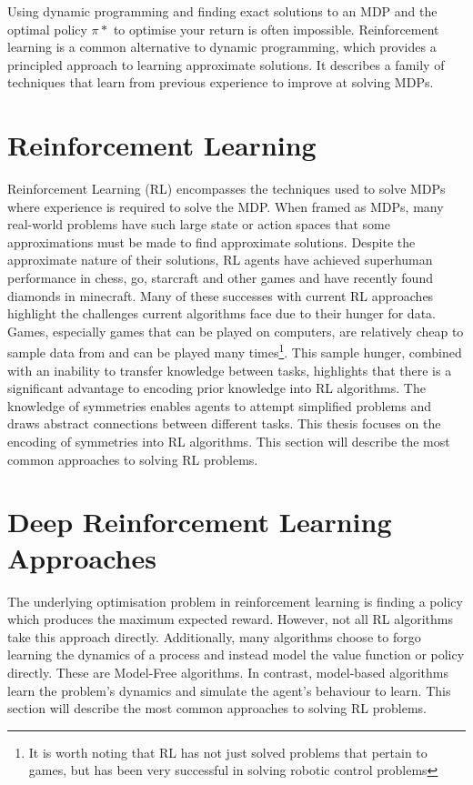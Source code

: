 Using dynamic programming and finding exact solutions to an MDP and the optimal policy $\pi*$ to optimise your return is often impossible. Reinforcement learning is a common alternative to dynamic programming, which provides a principled approach to learning approximate solutions. It describes a family of techniques that learn from previous experience to improve at solving MDPs.

\section{Reinforcement Learning}
Reinforcement Learning (RL) encompasses the techniques used to solve MDPs where experience is required to solve the MDP. When framed as MDPs, many real-world problems have such large state or action spaces that some approximations must be made to find approximate solutions. Despite the approximate nature of their solutions, RL agents have achieved superhuman performance in chess, go, starcraft and other games and have recently found diamonds in minecraft\cite{silver2016mastering,silver2017mastering,hafner2023mastering}. Many of these successes with current RL approaches highlight the challenges current algorithms face due to their hunger for data. Games, especially games that can be played on computers, are relatively cheap to sample data from and can be played many times\footnote{It is worth noting that RL has not just solved problems that pertain to games, but has been very successful in solving robotic control problems}. This sample hunger, combined with an inability to transfer knowledge between tasks, highlights that there is a significant advantage to encoding prior knowledge into RL algorithms. The knowledge of symmetries enables agents to attempt simplified problems and draws abstract connections between different tasks. This thesis focuses on the encoding of symmetries into RL algorithms. This section will describe the most common approaches to solving RL problems.

\section{Deep Reinforcement Learning Approaches}
The underlying optimisation problem in reinforcement learning is finding a policy which produces the maximum expected reward. However, not all RL algorithms take this approach directly. Additionally, many algorithms choose to forgo learning the dynamics of a process and instead model the value function or policy directly. These are Model-Free algorithms. In contrast, model-based algorithms learn the problem's dynamics and simulate the agent's behaviour to learn. This section will describe the most common approaches to solving RL problems.
